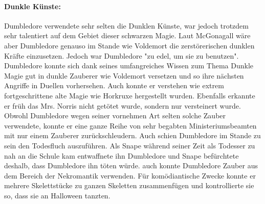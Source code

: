 \documentclass[a4paper, 10pt]{article}
\begin{document}
\paragraph{Dunkle Künste:}
Dumbledore verwendete sehr selten die Dunklen Künste, war jedoch trotzdem sehr talentiert auf dem Gebiet dieser schwarzen Magie. Laut McGonagall wäre aber Dumbledore genauso im Stande wie Voldemort die zerstörerischen dunklen Kräfte einzusetzen. Jedoch war Dumbledore "zu edel, um sie zu benutzen". Dumbledore konnte sich dank seines umfangreiches Wissen zum Thema Dunkle Magie gut in dunkle Zauberer wie Voldemort versetzen und so ihre nächsten Angriffe in Duellen vorhersehen. Auch konnte er verstehen wie extrem fortgeschrittene alte Magie wie Horkruxe hergestellt wurden. Ebenfalls erkannte er früh das Mrs. Norris nicht getötet wurde, sondern nur versteinert wurde. Obwohl Dumbledore wegen seiner vornehmen Art selten solche Zauber verwendete, konnte er eine ganze Reihe von sehr begabten Ministeriumsbeamten mit nur einem Zauberer zurückschleudern. Auch schien Dumbledore im Stande zu sein den Todesfluch auszuführen. Als Snape während seiner Zeit als Todesser zu nah an die Schule kam entwaffnete ihn Dumbledore und Snape befürchtete deshalb, dass Dumbledore ihn töten würde. auch konnte Dumbledore Zauber aus dem Bereich der Nekromantik verwenden. Für komödiantische Zwecke konnte er mehrere Skelettstücke zu ganzen Skeletten zusammenfügen und kontrollierte sie so, dass sie an Halloween tanzten.
\end{document}
